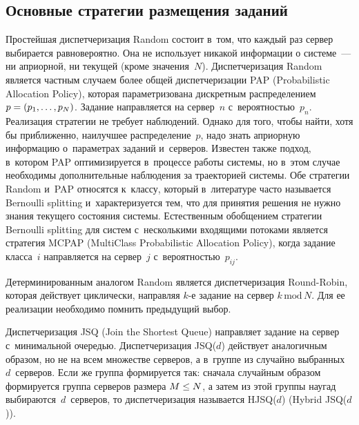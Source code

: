 \begin{multicols}{2}
\vspace*{-9pt}

\section{Основные стратегии размещения заданий}

\vspace*{-2pt}

    Простейшая диспетчеризация Random состоит в~том, что каждый раз сервер 
выбирается равновероятно. Она не использует никакой информации о системе~--- ни 
априорной, ни текущей (кроме значения~$N$). Диспетчеризация Random является 
частным случаем более общей диспетчеризации PAP (Probabilistic Allocation Policy), 
которая параметризована дискретным распределением $p\hm= (p_1,\ldots, p_N)$. Задание 
направляется на сервер~$n$ с~вероятностью~$p_n$. Реализация стратегии не требует 
наблюдений. Однако для того, чтобы найти, хотя бы приближенно, наилучшее 
распределение~$p$, надо знать априорную информацию о~параметрах заданий и~серверов. 
Известен также подход, в~котором PAP оптимизируется в~процессе работы системы, но 
в~этом случае необходимы дополнительные наблюдения за траекторией системы. Обе 
стратегии Random и~PAP относятся к~классу, который в~литературе часто называется 
Bernoulli splitting и~характеризуется тем, что для принятия решения не нужно знания 
текущего состояния системы. Естественным обобщением стратегии Bernoulli splitting для 
систем с~несколькими входящими потоками является стратегия MCPAP (MultiClass 
Probabilistic Allocation Policy), когда задание класса~$i$ направляется на сервер~$j$ 
с~вероятностью~$p_{ij}$.
    
    Детерминированным аналогом Random является диспетчеризация Round-Robin, 
которая действует циклически, направляя $k$-е задание на сервер $k\,\mathrm{mod}\,N$. 
Для ее реализации необходимо помнить предыдущий выбор.
    
    Диспетчеризация JSQ (Join the Shortest Queue) направляет задание на сервер 
    с~минимальной очередью. Диспетчеризация JSQ($d$) действует аналогичным образом, но 
не на всем множестве серверов, а в~группе из случайно выбранных~$d$~серверов. Если же 
группа формируется так: сначала случайным образом формируется группа серверов 
размера $M\hm\leq N$, а затем из этой группы наугад выбираются~$d$~серверов, то 
диспетчеризация называется HJSQ($d$) (Hybrid JSQ($d$)).
    

\end{multicols}
